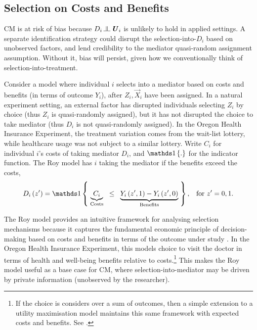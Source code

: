 \subsection{Selection on Costs and Benefits}
CM is at risk of bias because $D_i \indep  \vec U_i$ %
is unlikely to hold in applied settings.
A separate identification strategy could disrupt the selection-into-$D_i$ based on unobserved factors, and lend credibility to the mediator quasi-random assignment assumption.
Without it, bias will persist, given how we conventionally think of selection-into-treatment.

Consider a model where individual $i$ selects into a mediator based on costs and benefits (in terms of outcome $Y_i$), after $Z_i, \vec X_i$ have been assigned.
In a natural experiment setting, an external factor has disrupted individuals selecting $Z_i$ by choice (thus $Z_i$ is quasi-randomly assigned), but it has not disrupted the choice to take mediator (thus $D_i$ is not quasi-randomly assigned).
In the Oregon Health Insurance Experiment, the treatment variation comes from the wait-list lottery, while healthcare usage was not subject to a similar lottery.
Write $C_i$ for individual $i$'s costs of taking mediator $D_i$, and $\indicator{.}$ for the indicator function.
The Roy model has $i$ taking the mediator if the benefits exceed the costs,
\begin{equation}
    \label{eqn:roy-model}
    D_i \left( z' \right) = \indicator{ \;
    \underbrace{C_i}_{\text{Costs}} \;\; \leq \;\;
        \underbrace{
            Y_i\left( z', 1 \right) - Y_i\left( z', 0 \right)}_{\text{Benefits}}
    \;}, \;\;\; \text{for } z'=0,1.
\end{equation}

The Roy model provides an intuitive framework for analysing selection mechanisms because it captures the fundamental economic principle of decision-making based on costs and benefits in terms of the outcome under study \citep{roy1951some,heckman1990empirical}.
In the Oregon Health Insurance Experiment, this models choice to visit the doctor in terms of health and well-being benefits relative to costs.\footnote{
    If the choice is considers over a sum of outcomes, then a simple extension to a utility maximisation model maintains this same framework with expected costs and benefits.
    See \cite{heckman1990empirical,eisenhauer2015generalized}.
}
This makes the Roy model useful as a base case for CM, where selection-into-mediator may be driven by private information (unobserved by the researcher).

